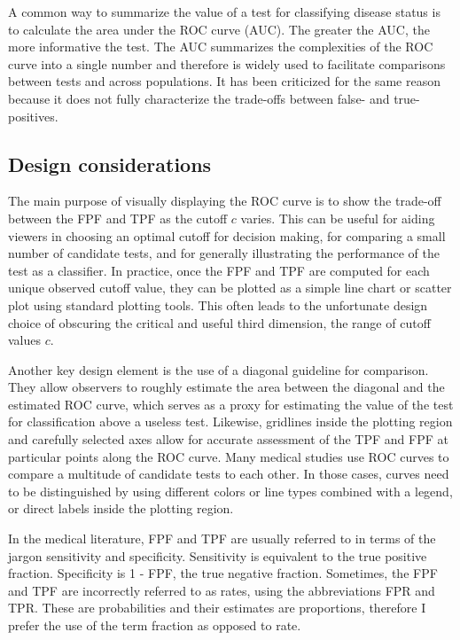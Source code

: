 \documentclass[codesnippet]{jss}
\begin{document}
A common way to summarize the value of a test for classifying disease
status is to calculate the area under the ROC curve (AUC). The greater
the AUC, the more informative the test. The AUC summarizes the
complexities of the ROC curve into a single number and therefore is
widely used to facilitate comparisons between tests and across
populations. It has been criticized for the same reason because it does
not fully characterize the trade-offs between false- and true-positives.

\subsection{Design considerations}\label{design-considerations}

The main purpose of visually displaying the ROC curve is to show the
trade-off between the FPF and TPF as the cutoff \(c\) varies. This can
be useful for aiding viewers in choosing an optimal cutoff for decision
making, for comparing a small number of candidate tests, and for
generally illustrating the performance of the test as a classifier. In
practice, once the FPF and TPF are computed for each unique observed
cutoff value, they can be plotted as a simple line chart or scatter plot
using standard plotting tools. This often leads to the unfortunate
design choice of obscuring the critical and useful third dimension, the
range of cutoff values \(c\).

Another key design element is the use of a diagonal guideline for
comparison. They allow observers to roughly estimate the area between
the diagonal and the estimated ROC curve, which serves as a proxy for
estimating the value of the test for classification above a useless
test. Likewise, gridlines inside the plotting region and carefully
selected axes allow for accurate assessment of the TPF and FPF at
particular points along the ROC curve. Many medical studies use ROC
curves to compare a multitude of candidate tests to each other. In those
cases, curves need to be distinguished by using different colors or line
types combined with a legend, or direct labels inside the plotting
region.

In the medical literature, FPF and TPF are usually referred to in terms
of the jargon sensitivity and specificity. Sensitivity is equivalent to
the true positive fraction. Specificity is 1 - FPF, the true negative
fraction. Sometimes, the FPF and TPF are incorrectly referred to as
rates, using the abbreviations FPR and TPR. These are probabilities and
their estimates are proportions, therefore I prefer the use of the term
fraction as opposed to rate.
\end{document}
